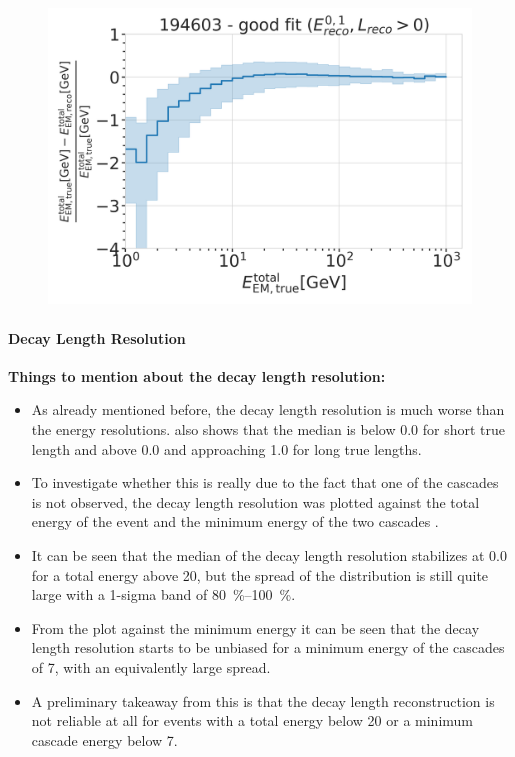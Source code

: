 \begin{figure}[h]
	\centering
    \includegraphics{figures/model_independent_simulation/results/realistic/resolutions/194603_fractional_reco_total_energy_error_goodfit.png}
    \caption[]{}
\end{figure}


\paragraph{Decay Length Resolution}

\textbf{Things to mention about the decay length resolution:}
\begin{itemize}
    \item As already mentioned before, the decay length resolution is much worse than the energy resolutions.  also shows that the median is below 0.0 for short true length and above 0.0 and approaching 1.0 for long true lengths.
    \item To investigate whether this is really due to the fact that one of the cascades is not observed, the decay length resolution was plotted against the total energy of the event and the minimum energy of the two cascades .
    \item It can be seen that the median of the decay length resolution stabilizes at 0.0 for a total energy above \SI{20}{\gev}, but the spread of the distribution is still quite large with a 1-sigma band of \SIrange{80}{100}{\percent}.
    \item From the plot against the minimum energy it can be seen that the decay length resolution starts to be unbiased for a minimum energy of the cascades of \SI{7}{\gev}, with an equivalently large spread.
    \item A preliminary takeaway from this is that the decay length reconstruction is not reliable at all for events with a total energy below \SI{20}{\gev} or a minimum cascade energy below \SI{7}{\gev}.
\end{itemize}

